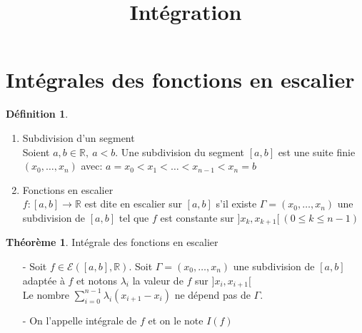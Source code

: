 \documentclass[fleqn]{article}
\title{Int\'egration}
\date{}
\theoremstyle{definition} \newtheorem*{defi}{D\'efinition}
\theoremstyle{definition} \newtheorem*{theo}{Th\'eor\`eme}
\theoremstyle{definition} \newtheorem*{coro}{Corollaire}
\theoremstyle{remark} \newtheorem*{rqs}{Remarques}
\theoremstyle{definition} \newtheorem*{prop}{Propri\'et\'e}
\begin{document}
\maketitle

\section{Int\'egrales des fonctions en escalier}
\begin{defi} $ $
\begin{enumerate}
	\item Subdivision d'un segment \\
		Soient $a, b\in \mathbb{R},\ a<b$. Une subdivision du segment $[a,b]$ est une suite finie $(x_0, \hdots, x_n)$ avec: $a=x_0 < x_1 < \hdots < x_{n-1} <  x_n = b$

	\item Fonctions en escalier\\
		$f: [a,b] \rightarrow \mathbb{R}$ est dite en escalier sur $[a,b]$ s'il existe $\Gamma = (x_0, \hdots, x_n)$ une subdivision de $[a,b]$
		tel que $f$ est constante sur $]x_k, x_{k+1}[\ (0 \leq k \leq n-1)$
\end{enumerate}
\end{defi}

\begin{theo} Int\'egrale des fonctions en escalier
	\begin{itemize}
	\item [-] Soit $f \in \mathcal{E}([a,b], \mathbb{R})$. Soit $\Gamma = (x_0, \hdots, x_n)$ une subdivision de $[a,b]$ adapt\'ee \`a $f$ et
		notons $\lambda_i$ la valeur de $f$ sur $]x_i, x_{i+1}[$ \\
		Le nombre $\sum_{i = 0}^{n-1} \lambda_i (x_{i+1} - x_i)$ ne d\'epend pas de $\Gamma$.
	\item [-] On l'appelle int\'egrale de $f$ et on le note $I(f)$
	\end{itemize}
\end{theo}
\end{document}
